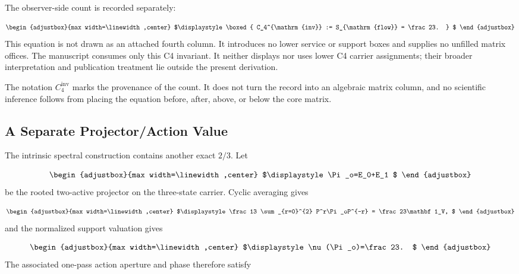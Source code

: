 The observer-side count is recorded separately:

\begin{equation*}
\begin{adjustbox}{max width=\linewidth,center}
$\displaystyle
\boxed{
C_4^{\mathrm{inv}}
:=
S_{\mathrm{flow}}
=
\frac23.
}
$
\end{adjustbox}
\end{equation*}
This equation is not drawn as an attached fourth column. It introduces no lower service or support boxes and supplies no unfilled matrix offices. The manuscript consumes only this C4 invariant. It neither displays nor uses lower C4 carrier assignments; their broader interpretation and publication treatment lie outside the present derivation.

The notation \(C_4^{\mathrm{inv}}\) marks the provenance of the count. It does not turn the record into an algebraic matrix column, and no scientific inference follows from placing the equation before, after, above, or below the core matrix.

\subsection{A Separate Projector/Action Value}
The intrinsic spectral construction contains another exact \(2/3\). Let

\begin{equation*}
\begin{adjustbox}{max width=\linewidth,center}
$\displaystyle
\Pi_o=E_0+E_1
$
\end{adjustbox}
\end{equation*}
be the rooted two-active projector on the three-state carrier. Cyclic averaging gives

\begin{equation*}
\begin{adjustbox}{max width=\linewidth,center}
$\displaystyle
\frac13
\sum_{r=0}^{2}
P^r\Pi_oP^{-r}
=
\frac23\mathbf1_V,
$
\end{adjustbox}
\end{equation*}
and the normalized support valuation gives

\begin{equation*}
\begin{adjustbox}{max width=\linewidth,center}
$\displaystyle
\nu(\Pi_o)=\frac23.
$
\end{adjustbox}
\end{equation*}
The associated one-pass action aperture and phase therefore satisfy

